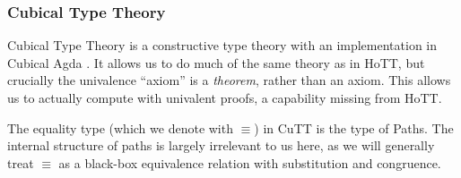 \subsubsection{Cubical Type Theory}
Cubical Type Theory \cite{cohenCubicalTypeTheory2016} is a constructive type
theory with an implementation in Cubical Agda
\cite{vezzosiCubicalAgdaDependently2019}.
It allows us to do much of the same theory as in HoTT, but crucially the
univalence ``axiom'' is a \emph{theorem}, rather than an axiom.
This allows us to actually compute with univalent proofs, a capability missing
from HoTT.
\begin{romdefinition} \label{path-types}
  The equality type (which we denote with \(\equiv\)) in CuTT is the type of
  Paths\footnotemark.
  The internal structure of paths is largely irrelevant to us here, as we will
  generally treat \(\equiv\) as a black-box equivalence relation with
  substitution and congruence.
\end{romdefinition}

